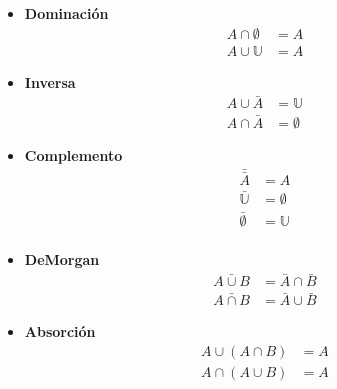 \begin{itemize}
\item \textbf{Dominación}
\begin{equation}
    \begin{array}{ll}
        A \cap \emptyset & = A \\
        A \cup \mathbb{U} & = A
    \end{array}
\end{equation}

\item \textbf{Inversa}
\begin{equation}
    \begin{array}{ll}
        A \cup \bar{A} & = \mathbb U \\
        A \cap \bar{A} & = \emptyset
    \end{array}
\end{equation}

\item \textbf{Complemento}
\begin{equation}
    \begin{array}{ll}
        \bar{\bar{A}} & = A \\
        \bar{\mathbb U} & = \emptyset \\
        \bar{\emptyset} & = \mathbb U \\
    \end{array}
\end{equation}

\item \textbf{DeMorgan}
\begin{equation}
    \begin{array}{ll}
        \bar{A \cup B} & = \bar{A} \cap \bar{B} \\
        \bar{A \cap B} & = \bar{A} \cup \bar{B}
    \end{array}
\end{equation}

\item \textbf{Absorción}
\begin{equation}
    \begin{array}{ll}
        A \cup (A \cap B) & = A \\
        A \cap (A \cup B) & = A
    \end{array}
\end{equation}

\end{itemize}
